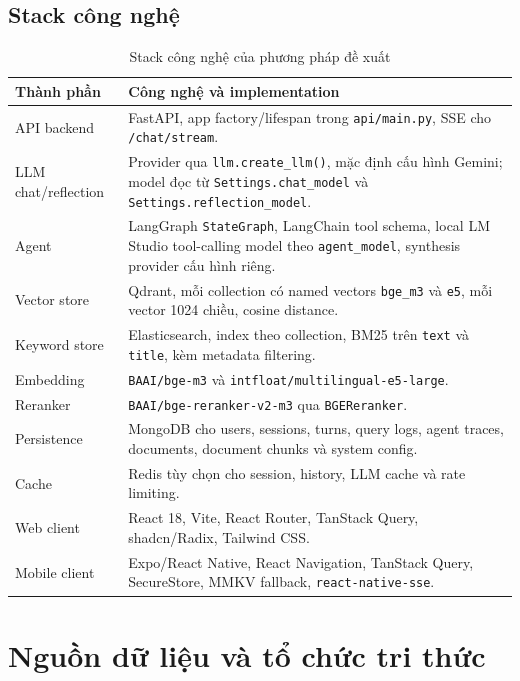 \documentclass[../DoAn.tex]{subfiles}
\begin{document}
\subsection{Stack công nghệ}

\begin{table}[h]
\centering
\begin{tabular}{|l|p{9.8cm}|}
\hline
\textbf{Thành phần} & \textbf{Công nghệ và implementation} \\
\hline
API backend & FastAPI, app factory/lifespan trong \texttt{api/main.py}, SSE cho
\texttt{/chat/stream}. \\
\hline
LLM chat/reflection & Provider qua \texttt{llm.create\_llm()}, mặc định cấu hình
Gemini; model đọc từ \texttt{Settings.chat\_model} và
\texttt{Settings.reflection\_model}. \\
\hline
Agent & LangGraph \texttt{StateGraph}, LangChain tool schema, local LM Studio
tool-calling model theo \texttt{agent\_model}, synthesis provider cấu hình riêng. \\
\hline
Vector store & Qdrant, mỗi collection có named vectors \texttt{bge\_m3} và
\texttt{e5}, mỗi vector 1024 chiều, cosine distance. \\
\hline
Keyword store & Elasticsearch, index theo collection, BM25 trên \texttt{text} và
\texttt{title}, kèm metadata filtering. \\
\hline
Embedding & \texttt{BAAI/bge-m3} và \texttt{intfloat/multilingual-e5-large}. \\
\hline
Reranker & \texttt{BAAI/bge-reranker-v2-m3} qua \texttt{BGEReranker}. \\
\hline
Persistence & MongoDB cho users, sessions, turns, query logs, agent traces,
documents, document chunks và system config. \\
\hline
Cache & Redis tùy chọn cho session, history, LLM cache và rate limiting. \\
\hline
Web client & React 18, Vite, React Router, TanStack Query, shadcn/Radix,
Tailwind CSS. \\
\hline
Mobile client & Expo/React Native, React Navigation, TanStack Query, SecureStore,
MMKV fallback, \texttt{react-native-sse}. \\
\hline
\end{tabular}
\caption{Stack công nghệ của phương pháp đề xuất}
\end{table}

\section{Nguồn dữ liệu và tổ chức tri thức}
\end{document}
